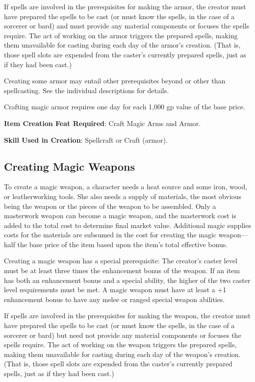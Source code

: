If spells are involved in the prerequisites for making the armor, the creator must have prepared the spells to be cast (or must know the spells, in the case of a sorcerer or bard) and must provide any material components or focuses the spells require. The act of working on the armor triggers the prepared spells, making them unavailable for casting during each day of the armor's creation. (That is, those spell slots are expended from the caster's currently prepared spells, just as if they had been cast.)
				
Creating some armor may entail other prerequisites beyond or other than spellcasting. See the individual descriptions for details.
				
Crafting magic armor requires one day for each 1,000 gp value of the base price.
				
\textbf{Item Creation Feat Required}: Craft Magic Arms and Armor.
				
\textbf{Skill Used in Creation}: Spellcraft or Craft (armor).
				
\subsection{Creating Magic Weapons}

				
To create a magic weapon, a character needs a heat source and some iron, wood, or leatherworking tools. She also needs a supply of materials, the most obvious being the weapon or the pieces of the weapon to be assembled. Only a masterwork weapon can become a magic weapon, and the masterwork cost is added to the total cost to determine final market value. Additional magic supplies costs for the materials are subsumed in the cost for creating the magic weapon---half the base price of the item based upon the item's total effective bonus.
				
Creating a magic weapon has a special prerequisite: The creator's caster level must be at least three times the enhancement bonus of the weapon. If an item has both an enhancement bonus and a special ability, the higher of the two caster level requirements must be met. A magic weapon must have at least a +1 enhancement bonus to have any melee or ranged special weapon abilities.
				
If spells are involved in the prerequisites for making the weapon, the creator must have prepared the spells to be cast (or must know the spells, in the case of a sorcerer or bard) but need not provide any material components or focuses the spells require. The act of working on the weapon triggers the prepared spells, making them unavailable for casting during each day of the weapon's creation. (That is, those spell slots are expended from the caster's currently prepared spells, just as if they had been cast.)
				
